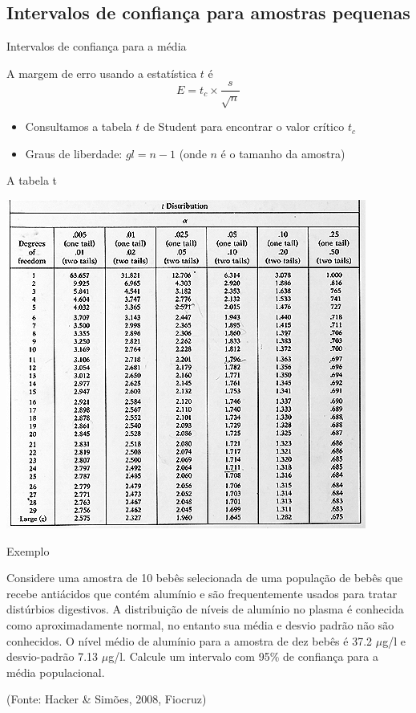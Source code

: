 \documentclass{beamer}
\begin{document}
\subsection{Intervalos de confiança para amostras pequenas}

\begin{frame}{Intervalos de confiança para a média}
  \begin{definition}
    A margem de erro usando a estatística $t$ é
    \begin{displaymath}
      E = t_c \times \frac{s}{\sqrt{n}}
    \end{displaymath}
  \end{definition}
  \begin{itemize}
  \item Consultamos a tabela $t$ de Student para encontrar o valor
    crítico $t_c$
  \item Graus de liberdade: \alert{$gl = n-1$} (onde $n$ é o tamanho da
    amostra)
  \end{itemize}
\end{frame}

\begin{frame}{A tabela t}
  \begin{center}
    \includegraphics[height=0.9\textheight]{t_table}
  \end{center}
\end{frame}

\begin{frame}{Exemplo}
  \begin{example}
    Considere uma amostra de 10 bebês selecionada de uma população de
    bebês que recebe antiácidos que contém alumínio e são
    frequentemente usados para tratar distúrbios digestivos. A
    distribuição de níveis de alumínio no plasma é conhecida como
    aproximadamente normal, no entanto sua média e desvio padrão não
    são conhecidos. O nível médio de alumínio para a amostra de dez
    bebês é 37.2 $\mu$g/l e desvio-padrão 7.13 $\mu$g/l. Calcule um
    intervalo com 95\% de confiança para a média populacional.
  \end{example}
  (Fonte: Hacker \& Simões, 2008, Fiocruz)
\end{frame}
\end{document}
